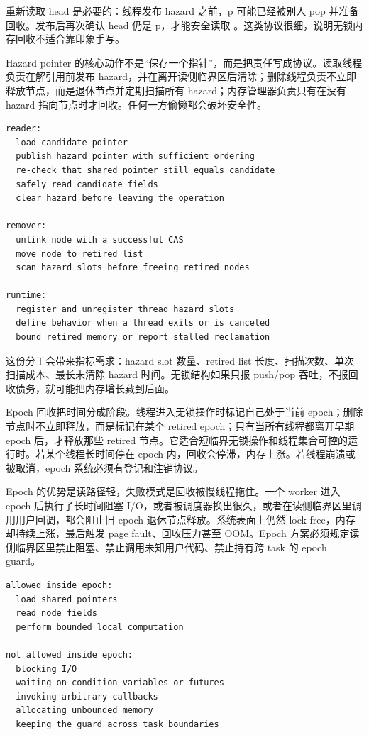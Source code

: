 重新读取 head 是必要的：线程发布 hazard 之前，p 可能已经被别人 pop 并准备回收。发布后再次确认 head 仍是 p，才能安全读取 。这类协议很细，说明无锁内存回收不适合靠印象手写。

Hazard pointer 的核心动作不是“保存一个指针”，而是把责任写成协议。读取线程负责在解引用前发布 hazard，并在离开读侧临界区后清除；删除线程负责不立即释放节点，而是退休节点并定期扫描所有 hazard；内存管理器负责只有在没有 hazard 指向节点时才回收。任何一方偷懒都会破坏安全性。

\begin{lstlisting}[numbers=none,caption={Hazard pointer 的责任分工}]
reader:
  load candidate pointer
  publish hazard pointer with sufficient ordering
  re-check that shared pointer still equals candidate
  safely read candidate fields
  clear hazard before leaving the operation

remover:
  unlink node with a successful CAS
  move node to retired list
  scan hazard slots before freeing retired nodes

runtime:
  register and unregister thread hazard slots
  define behavior when a thread exits or is canceled
  bound retired memory or report stalled reclamation
\end{lstlisting}

这份分工会带来指标需求：hazard slot 数量、retired list 长度、扫描次数、单次扫描成本、最长未清除 hazard 时间。无锁结构如果只报 push/pop 吞吐，不报回收债务，就可能把内存增长藏到后面。

Epoch 回收把时间分成阶段。线程进入无锁操作时标记自己处于当前 epoch；删除节点时不立即释放，而是标记在某个 retired epoch；只有当所有线程都离开早期 epoch 后，才释放那些 retired 节点。它适合短临界无锁操作和线程集合可控的运行时。若某个线程长时间停在 epoch 内，回收会停滞，内存上涨。若线程崩溃或被取消，epoch 系统必须有登记和注销协议。

Epoch 的优势是读路径轻，失败模式是回收被慢线程拖住。一个 worker 进入 epoch 后执行了长时间阻塞 I/O，或者被调度器换出很久，或者在读侧临界区里调用用户回调，都会阻止旧 epoch 退休节点释放。系统表面上仍然 lock-free，内存却持续上涨，最后触发 page fault、回收压力甚至 OOM。Epoch 方案必须规定读侧临界区里禁止阻塞、禁止调用未知用户代码、禁止持有跨 task 的 epoch guard。

\begin{lstlisting}[numbers=none,caption={epoch guard 的使用约束}]
allowed inside epoch:
  load shared pointers
  read node fields
  perform bounded local computation

not allowed inside epoch:
  blocking I/O
  waiting on condition variables or futures
  invoking arbitrary callbacks
  allocating unbounded memory
  keeping the guard across task boundaries
\end{lstlisting}


